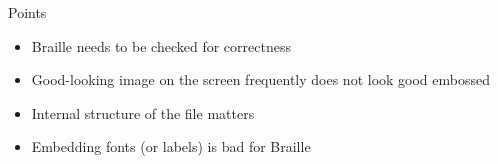 \begin{frame}{Points}


\begin{itemize}
\item
Braille needs to be checked for correctness


\vfill

\item
Good-looking image on the screen frequently does not look good embossed

\vfill

\item
Internal structure of the file matters

\vfill
\item
Embedding fonts (or labels) is bad for Braille

\end{itemize}

\vfill
\vfill


\end{frame}




